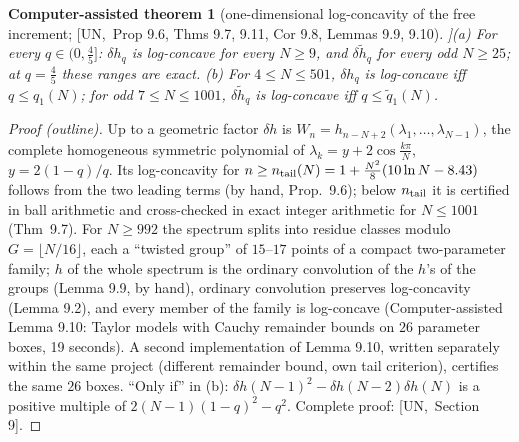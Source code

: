 \documentclass[10pt,a4paper]{article}
\theoremstyle{plain}
\newtheorem{catheorem}[theorem]{Computer-assisted theorem}
\theoremstyle{definition}
\newcommand{\src}[2]{[\textsf{#1},~#2]}           %
\newcommand{\UNI}{\textsf{UN}}
\begin{document}
\begin{catheorem}[one-dimensional log-concavity of the free increment; \src{\UNI}{Prop 9.6, Thms 9.7, 9.11, Cor 9.8, Lemmas 9.9, 9.10}]\label{thm:1d-freelc}
(a) For every $q\in(0,\frac45]$: $\delta h_q$ is log-concave for every $N\ge9$, and $\delta\tilde h_q$ for every odd $N\ge25$; at $q=\frac45$ these ranges are exact.
(b) For $4\le N\le501$, $\delta h_q$ is log-concave iff $q\le q_1(N)$; for odd $7\le N\le1001$, $\delta\tilde h_q$ is log-concave iff $q\le\tilde q_1(N)$.
\end{catheorem}
\begin{proof}[Proof (outline)]
Up to a geometric factor $\delta h$ is $W_n=h_{n-N+2}(\lambda_1,\dots,\lambda_{N-1})$, the complete homogeneous symmetric polynomial of $\lambda_k=y+2\cos\frac{k\pi}N$, $y=2(1-q)/q$. Its log-concavity for $n\ge n_{\rm tail}(N)=1+\frac{N^2}8(10\ln N-8.43)$ follows from the two leading terms (by hand, Prop.~9.6); below $n_{\rm tail}$ it is certified in ball arithmetic and cross-checked in exact integer arithmetic for $N\le1001$ (Thm~9.7). For $N\ge992$ the spectrum splits into residue classes modulo $G=\lfloor N/16\rfloor$, each a ``twisted group'' of $15$--$17$ points of a compact two-parameter family; $h$ of the whole spectrum is the ordinary convolution of the $h$'s of the groups (Lemma 9.9, by hand), ordinary convolution preserves log-concavity (Lemma 9.2), and every member of the family is log-concave (Computer-assisted Lemma 9.10: Taylor models with Cauchy remainder bounds on $26$ parameter boxes, 19 seconds). A second implementation of Lemma 9.10, written separately within the same project (different remainder bound, own tail criterion), certifies the same $26$ boxes. ``Only if'' in (b): $\delta h(N-1)^2-\delta h(N-2)\delta h(N)$ is a positive multiple of $2(N-1)(1-q)^2-q^2$. Complete proof: \src{\UNI}{Section 9}.
\end{proof}
\end{document}
